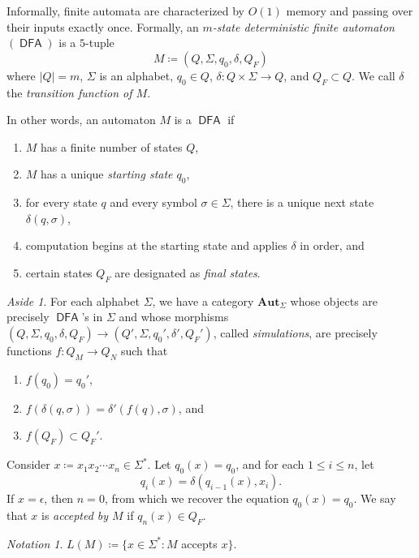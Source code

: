 \documentclass[10pt,letterpaper,cm]{nupset}
\theoremstyle{definition}
\theoremstyle{theorem}
\theoremstyle{remark}
\newtheorem*{aside}{Aside}
\newtheorem*{notation}{Notation}
\newcommand{\1}{\mathbf{1}}
\newcommand{\0}{\vec 0}
\DeclareMathOperator{\DFA}{\mathsf{DFA}}
\begin{document}
\bigskip

Informally, finite automata are characterized by $O(1)$ memory and passing over their inputs exactly once.
Formally, an \textit{$m$-state deterministic finite automaton $(\DFA)$}  is a $5$-tuple 
\[ \label{eqn:auto}
M\coloneqq \left(Q, \Sigma, q_0, \delta, Q_F\right)  \tag{$\alpha$}
\] where  $\left\lvert{Q}\right\rvert = m$, $\Sigma$ is an alphabet, $q_0\in Q$, $\delta : Q\times \Sigma \to Q$, and $Q_F\subset Q$. We call $\delta$ the \textit{transition function of $M$}.

In other words, an automaton $M$ is a $\DFA$ if
\begin{enumerate}[label=(\alph*)]
\item $M$ has a finite number of states $Q$,
\item $M$ has a unique \textit{starting state $q_0$},
\item for every state $q$ and every symbol $\sigma \in \Sigma$, there is a unique next state $\delta(q, \sigma)$,
\item computation begins at the starting state and applies $\delta$ in order, and
\item certain states $Q_F$ are designated as \textit{final states}.
\end{enumerate}

\begin{aside}
For each alphabet $\Sigma$, we have a category $\mathbf{Aut}_{\Sigma}$ whose objects are precisely $\DFA$'s in $\Sigma$ and  whose morphisms $ \left(Q, \Sigma, q_0, \delta, Q_F\right)  \to  \left(Q', \Sigma, q_0', \delta', Q_F'\right) $, called \textit{simulations}, are precisely functions $f: Q_M \to Q_N$ such that
\begin{enumerate}[label=(\roman*)]
\item $f(q_0) = q_0'$,
\item $f(\delta(q, \sigma)) = \delta'(f(q), \sigma)$, and
\item $f(Q_F) \subset Q_F'$.
\end{enumerate}
\end{aside}

\medskip

Consider $x\coloneqq x_1x_2\cdots x_n \in \Sigma^{\ast}$. Let $q_0(x) = q_0$, and for each $1\leq i\leq n$, let $$q_i(x) =\delta(q_{i-1}(x), x_i).$$ If $x= \epsilon$, then $n=0$, from which we recover the equation $q_0(x) = q_0$. We say that $x$ is \textit{accepted by $M$} if $q_n(x) \in Q_F$. 


\begin{notation}
$L(M) \coloneqq\{x\in \Sigma^{\ast} : M$ accepts $x\}$.
\end{notation}
\end{document}
